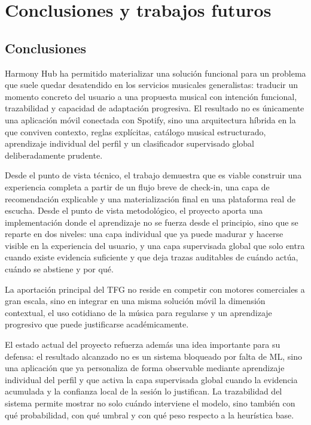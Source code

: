 \chapter{Conclusiones y trabajos futuros}
\label{ch:conclusiones}


\section{Conclusiones}
\label{sec:conclusiones}

Harmony Hub ha permitido materializar una solución funcional para un problema
que suele quedar desatendido en los servicios musicales generalistas: traducir
un momento concreto del usuario a una propuesta musical con intención
funcional, trazabilidad y capacidad de adaptación progresiva. El resultado no
es únicamente una aplicación móvil conectada con Spotify, sino una arquitectura
híbrida en la que conviven contexto, reglas explícitas, catálogo musical
estructurado, aprendizaje individual del perfil y un clasificador supervisado
global deliberadamente prudente.

Desde el punto de vista técnico, el trabajo demuestra que es viable construir
una experiencia completa a partir de un flujo breve de check-in, una capa de
recomendación explicable y una materialización final en una plataforma real de
escucha. Desde el punto de vista metodológico, el proyecto aporta una
implementación donde el aprendizaje no se fuerza desde el principio, sino que
se reparte en dos niveles: una capa individual que ya puede madurar y hacerse
visible en la experiencia del usuario, y una capa supervisada global que solo
entra cuando existe evidencia suficiente y que deja trazas auditables de
cuándo actúa, cuándo se abstiene y por qué.

La aportación principal del TFG no reside en competir con motores comerciales a
gran escala, sino en integrar en una misma solución móvil la dimensión
contextual, el uso cotidiano de la música para regularse y un aprendizaje
progresivo que puede justificarse académicamente.

El estado actual del proyecto refuerza además una idea importante para su
defensa: el resultado alcanzado no es un sistema bloqueado por falta de ML,
sino una aplicación que ya personaliza de forma observable mediante
aprendizaje individual del perfil y que activa la capa supervisada global
cuando la evidencia acumulada y la confianza local de la sesión lo justifican.
La trazabilidad del sistema permite mostrar no solo cuándo interviene el
modelo, sino también con qué probabilidad, con qué umbral y con qué peso
respecto a la heurística base.

